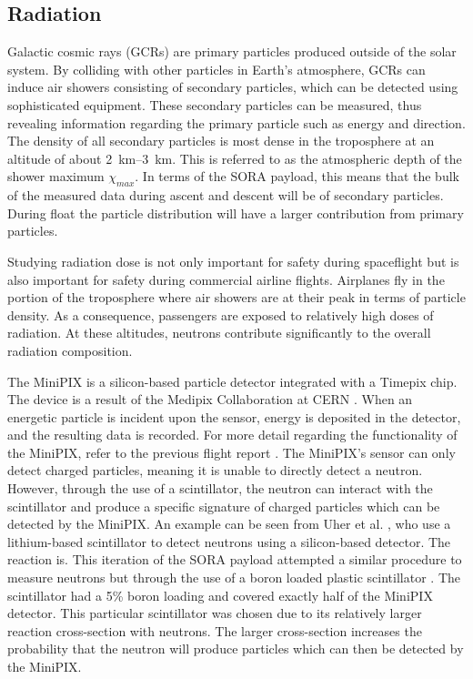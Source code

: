 \subsection{Radiation}
\label{sec: Radiation Background}

Galactic cosmic rays (GCRs) are primary particles produced outside of the solar system.
By colliding with other particles in Earth's atmosphere, GCRs can induce air showers consisting of secondary particles, which can be detected using sophisticated equipment.
These secondary particles can be measured, thus revealing information regarding the primary particle such as energy and direction. 
The density of all secondary particles \cite{Frank} is most dense in the troposphere at an altitude of about \SIrange{2}{3}{\kilo\meter}.
This is referred to as the atmospheric depth of the shower maximum $\chi _{max}$.
In terms of the SORA payload, this means that the bulk of the measured data during ascent and descent will 
be of secondary particles.
During float the particle distribution will have a larger contribution from primary particles.

Studying radiation dose is not only important for safety during spaceflight but is also important for safety during commercial airline flights.
Airplanes fly in the portion of the troposphere where air showers are at their peak in terms of particle density. As a consequence, passengers are exposed to relatively high doses of radiation.
At these altitudes, neutrons contribute significantly to the overall radiation composition.

The MiniPIX \cite{silicon_sensor} is a silicon-based particle detector integrated with a Timepix \cite{timepix} chip. The device is a result of the Medipix Collaboration at CERN \cite{medipix}. 
When an energetic particle is incident upon the sensor, energy is deposited in the detector, and the resulting data is recorded.
For more detail regarding the functionality of the MiniPIX, refer to the previous flight report \cite{SORA}.
The MiniPIX's sensor can only detect charged particles, meaning it is unable to directly detect a neutron. However, through the use of a scintillator, the neutron can interact with the scintillator and produce a specific signature of charged particles which can be detected by the MiniPIX.
An example can be seen from Uher et al. \cite{Uher}, who use a lithium-based scintillator to detect neutrons using a silicon-based detector. The reaction is.
This iteration of the SORA payload attempted a similar procedure to measure neutrons but through the use of a boron loaded plastic scintillator \cite{BoronScintillator}.
The scintillator had a 5\% boron loading and covered exactly half of the MiniPIX detector.
This particular scintillator was chosen due to its relatively larger reaction cross-section with neutrons.
The larger cross-section increases the probability that the neutron will produce particles which can then be detected by the MiniPIX.